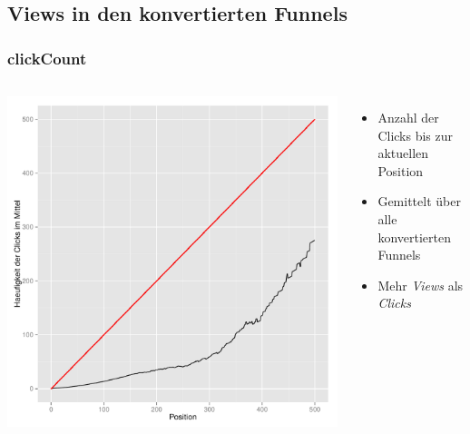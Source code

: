 \subsection{Views in den konvertierten Funnels}

\begin{frame}\frametitle{clickCount}
	\begin{columns}
		\column{7cm}
			\includegraphics[scale=0.39]{clickCountSucc.pdf}
		\column{4cm}
			\begin{itemize}
				\item Anzahl der Clicks bis zur aktuellen Position
				\item Gemittelt über alle konvertierten Funnels
				\item Mehr \textit{Views} als \textit{Clicks}
			\end{itemize}
	\end{columns}
\end{frame}


